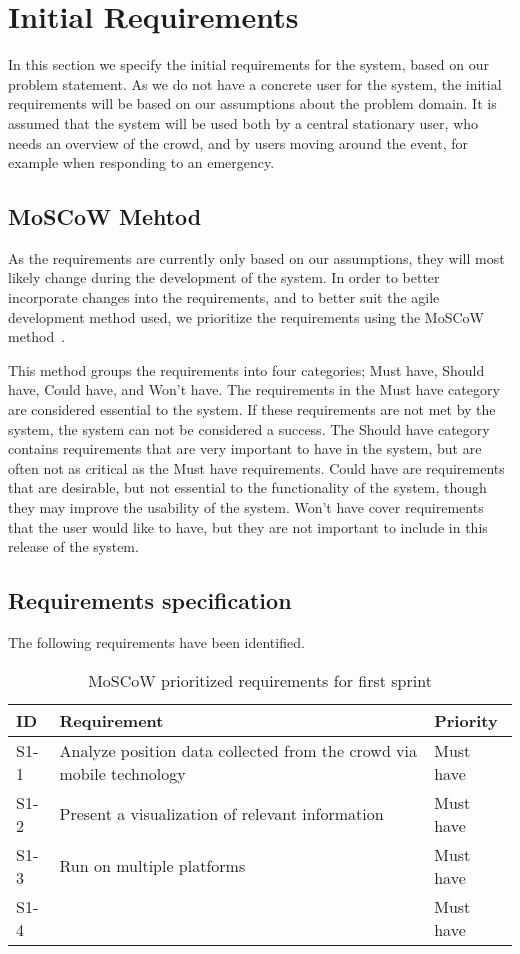 \section{Initial Requirements}\label{sec:s1_requirements}
In this section we specify the initial requirements for the system, based on our problem statement. As we do not have a concrete user for the system, the initial requirements will be based on our assumptions about the problem domain. It is assumed that the system will be used both by a central stationary user, who needs an overview of the crowd, and by users moving around the event, for example when responding to an emergency. 



\subsection{MoSCoW Mehtod}
As the requirements are currently only based on our assumptions, they will most likely change during the development of the system. In order to better incorporate changes into the requirements, and to better suit the agile development method used, we prioritize the requirements using the MoSCoW method~\cite{moscow}.

This method groups the requirements into four categories; Must have, Should have, Could have, and Won't have. The requirements in the Must have category are considered essential to the system. If these requirements are not met by the system, the system can not be considered a success. The Should have category contains requirements that are very important to have in the system, but are often not as critical as the Must have requirements. Could have are requirements that are desirable, but not essential to the functionality of the system, though they may improve the usability of the system. Won't have cover requirements that the user would like to have, but they are not important to include in this release of the system.

\subsection{Requirements specification}

The following requirements have been identified.

\begin{table}[]
	\centering
	\begin{tabularx}{\textwidth}{lXl}
		\toprule
		\textbf{ID} & \textbf{Requirement} & \textbf{Priority} \\
		\toprule 
		\rowcolor[HTML]{EFEFEF} 
		S1-1  & Analyze position data collected from the crowd via mobile technology    & Must have \\
		S1-2  & Present a visualization of relevant information                         & Must have \\
		\rowcolor[HTML]{EFEFEF} 
		S1-3  & Run on multiple platforms                                               & Must have \\
		S1-4  &  & Must have
		\bottomrule
	\end{tabularx}
	\caption{MoSCoW prioritized requirements for first sprint}
	\label{tab:s1_req}
\end{table}



